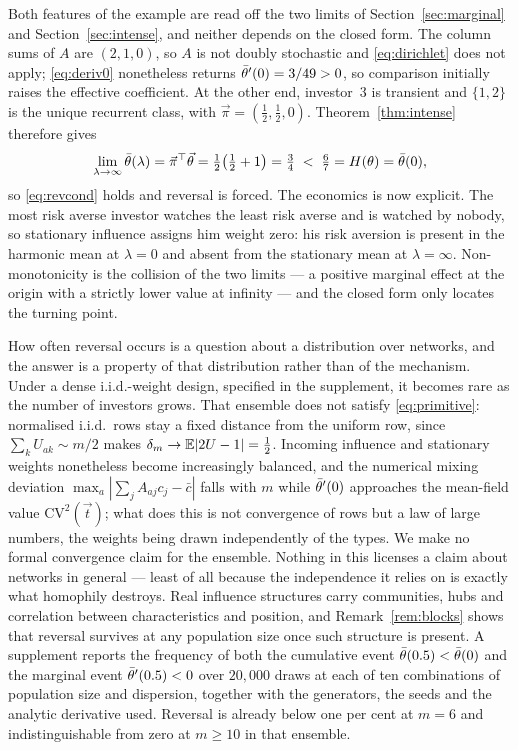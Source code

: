 Both features of the example are read off the two limits of
Section~\ref{sec:marginal} and Section~\ref{sec:intense}, and neither depends on
the closed form. The column sums of $A$ are $(2,1,0)$, so $A$ is not doubly
stochastic and \eqref{eq:dirichlet} does not apply; \eqref{eq:deriv0}
nonetheless returns $\bar\theta'(0)=3/49>0$, so comparison initially raises the
effective coefficient. At the other end, investor~3 is transient and
$\{1,2\}$ is the unique recurrent class, with $\vec\pi=(\tfrac12,\tfrac12,0)$.
Theorem~\ref{thm:intense} therefore gives
%
\begin{equation*}
\lim_{\lambda\to\infty}\bar\theta(\lambda)
=\vec\pi^{\top}\vec\theta=\tfrac12\big(\tfrac12+1\big)=\tfrac34
\;<\;\tfrac67=H(\theta)=\bar\theta(0),
\end{equation*}
%
so \eqref{eq:revcond} holds and reversal is forced. The economics is now
explicit. The most risk averse investor watches the least risk averse and is
watched by nobody, so stationary influence assigns him weight zero: his risk
aversion is present in the harmonic mean at $\lambda=0$ and absent from the
stationary mean at $\lambda=\infty$. Non-monotonicity is the collision of the
two limits --- a positive marginal effect at the origin with a strictly lower
value at infinity --- and the closed form only locates the turning point.

How often reversal occurs is a question about a distribution over networks, and
the answer is a property of that distribution rather than of the mechanism.
Under a dense i.i.d.-weight design, specified in the supplement, it becomes rare
as the number of investors grows. That ensemble does not satisfy
\eqref{eq:primitive}: normalised i.i.d.\ rows stay a fixed distance from the
uniform row, since $\sum_kU_{ak}\sim m/2$ makes
$\delta_m\to\mathbb{E}|2U-1|=\tfrac12$. Incoming influence and stationary weights
nonetheless become increasingly balanced, and the numerical mixing deviation
$\max_a|\sum_jA_{aj}c_j-\bar c|$ falls with $m$ while $\bar\theta'(0)$ approaches the
mean-field value $\mathrm{CV}^{2}(\vec t)$; what does this is not convergence of
rows but a law of large numbers, the weights being drawn independently of the
types. We make no formal convergence claim for the ensemble. Nothing in this
licenses a claim about networks in general --- least of all because the
independence it relies on is exactly what homophily destroys. Real influence structures carry
communities, hubs and correlation between characteristics and position, and
Remark~\ref{rem:blocks} shows that reversal survives at any population size once
such structure is present.
A supplement reports the frequency of both the cumulative event
$\bar\theta(0.5)<\bar\theta(0)$ and the marginal event $\bar\theta'(0.5)<0$ over $20{,}000$ draws
at each of ten combinations of population size and dispersion, together with the
generators, the seeds and the analytic derivative used. Reversal is already
below one per cent at $m=6$ and indistinguishable from zero at $m\geq10$ in that
ensemble.

